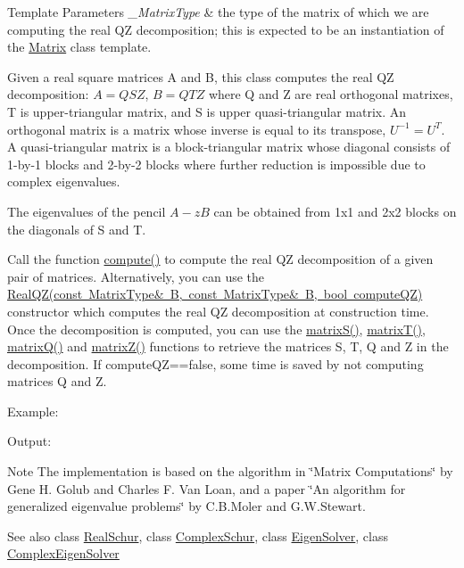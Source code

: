 \begin{DoxyTemplParams}{Template Parameters}
{\em \+\_\+\+Matrix\+Type} & the type of the matrix of which we are computing the real QZ decomposition; this is expected to be an instantiation of the \mbox{\hyperlink{class_eigen_1_1_matrix}{Matrix}} class template.\\
\hline
\end{DoxyTemplParams}
Given a real square matrices A and B, this class computes the real QZ decomposition\+: $ A = Q S Z $, $ B = Q T Z $ where Q and Z are real orthogonal matrixes, T is upper-\/triangular matrix, and S is upper quasi-\/triangular matrix. An orthogonal matrix is a matrix whose inverse is equal to its transpose, $ U^{-1} = U^T $. A quasi-\/triangular matrix is a block-\/triangular matrix whose diagonal consists of 1-\/by-\/1 blocks and 2-\/by-\/2 blocks where further reduction is impossible due to complex eigenvalues.

The eigenvalues of the pencil $ A - z B $ can be obtained from 1x1 and 2x2 blocks on the diagonals of S and T.

Call the function \mbox{\hyperlink{class_eigen_1_1_real_q_z_a2b6847964d9f1903193cc3e67c196849}{compute()}} to compute the real QZ decomposition of a given pair of matrices. Alternatively, you can use the \mbox{\hyperlink{class_eigen_1_1_real_q_z_ac6e41c839f8dae31c9a3906ea7540119}{Real\+Q\+Z(const Matrix\+Type\& B, const Matrix\+Type\& B, bool compute\+Q\+Z)}} constructor which computes the real QZ decomposition at construction time. Once the decomposition is computed, you can use the \mbox{\hyperlink{class_eigen_1_1_real_q_z_ad24d7bf534afb55adaef00f00846adaf}{matrix\+S()}}, \mbox{\hyperlink{class_eigen_1_1_real_q_z_a8dc963d8ea2a17df9d8d718e9e34d06f}{matrix\+T()}}, \mbox{\hyperlink{class_eigen_1_1_real_q_z_a212bc2f69ea4eff830fde70e209e40fb}{matrix\+Q()}} and \mbox{\hyperlink{class_eigen_1_1_real_q_z_a19a116383f11423179b4d8f316da6f67}{matrix\+Z()}} functions to retrieve the matrices S, T, Q and Z in the decomposition. If compute\+QZ==false, some time is saved by not computing matrices Q and Z.

Example\+: 
\begin{DoxyCodeInclude}{0}
\end{DoxyCodeInclude}
 Output\+: 
\begin{DoxyCodeInclude}{0}
\end{DoxyCodeInclude}


\begin{DoxyNote}{Note}
The implementation is based on the algorithm in \char`\"{}\+Matrix Computations\char`\"{} by Gene H. Golub and Charles F. Van Loan, and a paper \char`\"{}\+An algorithm for
generalized eigenvalue problems\char`\"{} by C.\+B.\+Moler and G.\+W.\+Stewart.
\end{DoxyNote}
\begin{DoxySeeAlso}{See also}
class \mbox{\hyperlink{class_eigen_1_1_real_schur}{Real\+Schur}}, class \mbox{\hyperlink{class_eigen_1_1_complex_schur}{Complex\+Schur}}, class \mbox{\hyperlink{class_eigen_1_1_eigen_solver}{Eigen\+Solver}}, class \mbox{\hyperlink{class_eigen_1_1_complex_eigen_solver}{Complex\+Eigen\+Solver}} 
\end{DoxySeeAlso}


